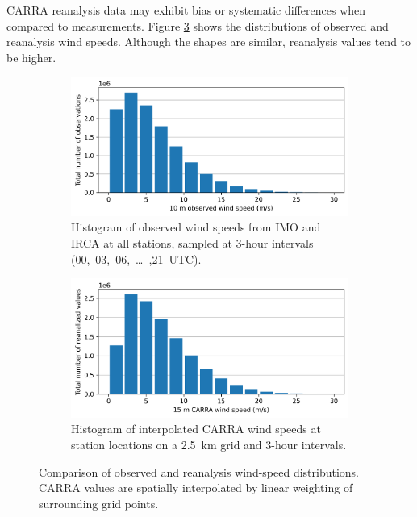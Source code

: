 CARRA reanalysis data may exhibit bias or systematic differences when compared to measurements. Figure \ref{fig:obs_carra_wind_speeds} shows the distributions of observed and reanalysis wind speeds. Although the shapes are similar, reanalysis values tend to be higher.

\begin{figure}[ht]
  \centering
  \begin{subfigure}[b]{0.8\textwidth}
    \centering
    \includegraphics[width=\textwidth]{Figures/obs_wind_speeds.png}
    \caption{Histogram of observed wind speeds from IMO and IRCA at all stations, sampled at 3-hour intervals (00,~03,~06,~…~,21~UTC).}
    \label{fig:obs_wind_speeds}
  \end{subfigure}
  
  \vspace{0.5cm}
  
  \begin{subfigure}[b]{0.8\textwidth}
    \centering
    \includegraphics[width=\textwidth]{Figures/carra_wind_speeds.png}
    \caption{Histogram of interpolated CARRA wind speeds at station locations on a 2.5~km grid and 3-hour intervals.}
    \label{fig:carra_wind_speeds}
  \end{subfigure}
  
  \caption{Comparison of observed and reanalysis wind-speed distributions. CARRA values are spatially interpolated by linear weighting of surrounding grid points.}
  \label{fig:obs_carra_wind_speeds}
\end{figure}

